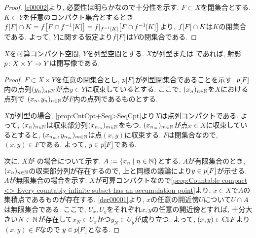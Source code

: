 \documentclass[uplatex, dvipdfmx, a4paper, 12pt, class=jsbook, crop=false]{standalone}
\begin{document}
\begin{proof}
	\cref{c00002}より, 必要性は明らかなので十分性を示す.
	$ F \subset X $を閉集合とする. $ K \subset Y $を任意のコンパクト集合とするとき
	$ \mapset{f}{F} \cap K = \mapset{f}{F \cap \mapinvset{f}{K}}
	= \mapset{f|_{\mapinvset{f}{K}}}{F \cap  \mapinvset{f}{K}} $より,
	$ \mapset{f}{F} \cap K $は$ K $の閉集合である.
	よって, $ Y $に関する仮定より$ \mapset{f}{F} $は$ Y $の閉集合である.
\end{proof}

\begin{proposition}
	$ X $を可算コンパクト空間, $ Y $を列型空間とする. $ X $が列型または  であれば,
	射影$ p\colon X \times Y\to Y $は閉写像である.
\end{proposition}

\begin{proof}
	$ F \subset X \times Y $を任意の閉集合とし, $ \mapset{p}{F} $が列型閉集合であることを示す.
	$ \mapset{p}{F} $内の点列$ (y_n)_{n \in \mathbb{N}} $が点$ y \in Y $に収束しているとする.
	ここで, $ (x_n)_{n \in \mathbb{N}} $を$ X $における点列で
	$ (x_n, y_n)_{n \in \mathbb{N}}  $が$ F $内の点列であるものとする.

	$ X $が列型の場合, \cref{prop:CntCpt+Seq>SeqCpt}より$ X $は点列コンパクトである.
	よって, $ (x_n)_{n \in \mathbb{N}} $は収束部分列$ (x_{n_m})_{m \in \mathbb{N}} $をもつ.
	$ (x_{n_m})_{m \in \mathbb{N}} $が点$ x \in X $に収束しているとすると,
	$ (x_{n_m}, y_{n_m})_{m \in \mathbb{N}} $は点$ (x, y) $に収束する.
	$ F $は閉集合なので, $ (x, y) \in F $である.
	よって, $ y \in \mapset{p}{F} $である.

	次に, $ X $が  の場合について示す.
	$ A \defeq \setcomp{x_n}{n \in \N} $とする.
	$ A $が有限集合のとき, $ (x_n)_{n \in \mathbb{N}} $の収束部分列が存在するので,
	上と同様の議論により$ y \in \mapset{p}{F} $が示せる.
	$ A $が無限集合の場合を示す.
	$ X $が可算コンパクトなので\cref{prop:Countable compact <> Every countably infinite subset has an accumulation point}より,
	$ x \in X $で$ A $の集積点であるものが存在する.
	\cref{der00001}より, $ x $の任意の開近傍$ U $について$ U \cap A $は無限集合である.
	ここで, $ U_x, U_y $をそれぞれ$ x, y $の任意の開近傍とすれば,
	十分大きい$ N \in \mathbb{N} $が存在して$ x_N \in U_x $かつ$ y_N \in U_y $が成り立つ.
	よって, $ (x, y) \in \mathop{\mathrm{Cl}}\nolimits F $より$ (x, y) \in F $なので
	$ y \in \mapset{p}{F} $となる.
\end{proof}
\end{document}
